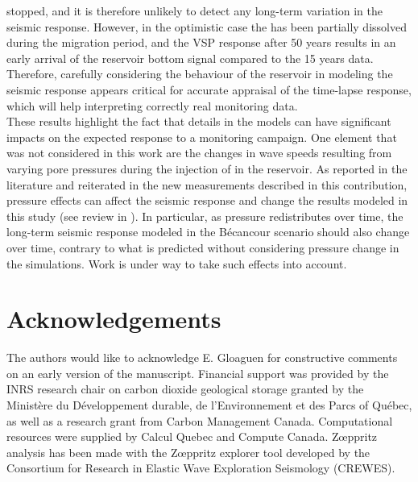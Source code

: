 stopped, and it is therefore unlikely to detect any long-term variation in the
seismic response. However, in the optimistic case the  has been
partially dissolved during the migration period, and the VSP response after 50
years results in an early arrival of the reservoir bottom signal compared to the
15 years data. Therefore, carefully considering the behaviour of the reservoir
in modeling the seismic response appears critical for accurate appraisal of the
time-lapse response, which will help interpreting correctly real monitoring
data. \\
These results highlight the fact that details in the models can have significant
impacts on the expected response to a monitoring campaign. One element that was
not considered in this work are the changes in wave speeds resulting from
varying pore pressures during the injection of  in the reservoir. As
reported in the literature and reiterated in the new measurements described in
this contribution, pressure effects can affect the seismic response and change
the results modeled in this study (see review in \citet{Schmitt2015}). In
particular, as pressure redistributes over time, the long-term seismic response
modeled in the Bécancour scenario should also change over time, contrary to what
is predicted without considering pressure change in the simulations.  Work is
under way to take such effects into account.
\section{Acknowledgements}
The authors would like to acknowledge E. Gloaguen for constructive comments on
an early version of the manuscript. Financial support was provided by the INRS
research chair on carbon dioxide geological storage granted by the Minist\`ere
du D\'e\-ve\-loppe\-ment durable, de l'En\-vi\-ron\-ne\-ment et des Parcs of
Qu\'ebec, as well as a research grant from Carbon Management Canada.
Computational resources were supplied by Calcul Quebec and Compute Canada.
Zœppritz analysis has been made with the Zœppritz explorer tool developed by the
Consortium for Research in Elastic Wave Exploration Seismology (CREWES).
